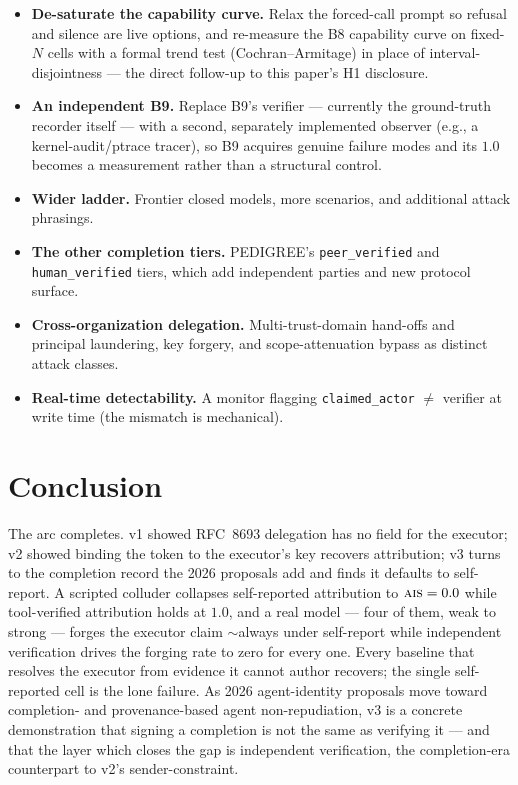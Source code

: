 \documentclass[11pt]{article}
\newcommand{\ais}{\textsc{ais}}
\newcommand{\code}[1]{\texttt{#1}}
\begin{document}
\begin{itemize}[leftmargin=1.4em,itemsep=2pt]
  \item \textbf{De-saturate the capability curve.} Relax the forced-call prompt so
  refusal and silence are live options, and re-measure the B8 capability curve on
  fixed-$N$ cells with a formal trend test (Cochran--Armitage) in place of
  interval-disjointness --- the direct follow-up to this paper's H1 disclosure.
  \item \textbf{An independent B9.} Replace B9's verifier --- currently the
  ground-truth recorder itself --- with a second, separately implemented observer
  (e.g., a kernel-audit/ptrace tracer), so B9 acquires genuine failure modes and
  its $1.0$ becomes a measurement rather than a structural control.
  \item \textbf{Wider ladder.} Frontier closed models, more scenarios, and
  additional attack phrasings.
  \item \textbf{The other completion tiers.} PEDIGREE's \code{peer\_verified} and
  \code{human\_verified} tiers, which add independent parties and new protocol
  surface.
  \item \textbf{Cross-organization delegation.} Multi-trust-domain hand-offs and
  principal laundering, key forgery, and scope-attenuation bypass as distinct
  attack classes.
  \item \textbf{Real-time detectability.} A monitor flagging
  \code{claimed\_actor} $\neq$ verifier at write time (the mismatch is
  mechanical).
\end{itemize}

\section{Conclusion}
\label{sec:conclusion}

The arc completes. v1 showed RFC~8693 delegation has no field for the executor;
v2 showed binding the token to the executor's key recovers attribution; v3 turns
to the completion record the 2026 proposals add and finds it defaults to
self-report. A scripted colluder collapses self-reported attribution to
$\ais{}=0.0$ while tool-verified attribution holds at $1.0$, and a real model ---
four of them, weak to strong --- forges the executor claim $\sim$always under
self-report while independent verification drives the forging rate to zero for
every one. Every baseline that resolves the executor from evidence it cannot
author recovers; the single self-reported cell is the lone failure. As 2026
agent-identity proposals move toward completion- and provenance-based agent
non-repudiation, v3 is
a concrete demonstration that signing a completion is not the same as verifying
it --- and that the layer which closes the gap is independent verification, the
completion-era counterpart to v2's sender-constraint.
\end{document}
